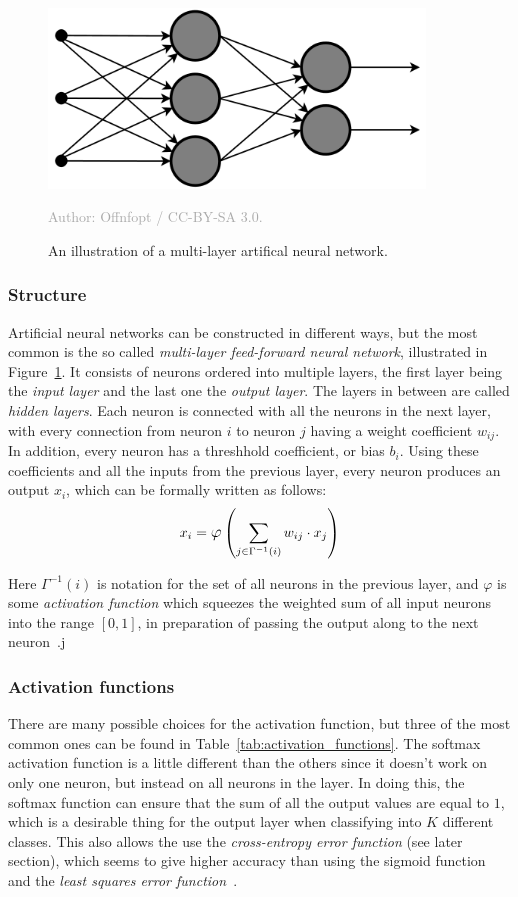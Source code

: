 \documentclass{kththesis}
\newcommand{\source}[1]{\vspace{-5mm}\caption*{\textcolor{darkgray}{Author: {#1}}\vspace{-7mm}} }
\begin{document}
\begin{figure}
  \begin{center}
    \includegraphics[width=100mm]{img/neural_network.png}
    \caption{An illustration of a multi-layer artifical neural network. }
    \source{Offnfopt / CC-BY-SA 3.0.}
    \label{fig:mlf}
  \end{center}
\end{figure}

\subsubsection{Structure}
Artificial neural networks can be constructed in different ways, but the most common is the so called \textit{multi-layer feed-forward neural network}, illustrated in Figure~\ref{fig:mlf}. It consists of neurons ordered into multiple layers, the first layer being the \textit{input layer} and the last one the \textit{output layer}. The layers in between are called \textit{hidden layers}. Each neuron is connected with all the neurons in the next layer, with every connection from neuron $i$ to neuron $j$ having a weight coefficient $w_{ij}$. In addition, every neuron has a threshhold coefficient, or bias $b_i$. Using these coefficients and all the inputs from the previous layer, every neuron produces an output $x_i$, which can be formally written as follows:
\[x_i = \mathlarger{\varphi}\left(\sum_{j \in \Gamma^{-1}(i)}{w_{ij} \cdot x_j}\right)\]

Here $\Gamma^{-1}(i)$ is notation for the set of all neurons in the previous layer, and $\varphi$ is some \textit{activation function} which squeezes the weighted sum of all input neurons into the range $[0, 1]$, in preparation of passing the output along to the next neuron~\cite{mlfIntro}.j

\subsubsection{Activation functions}
There are many possible choices for the activation function, but three of the most common ones can be found in Table~\ref{tab:activation_functions}. The softmax activation function is a little different than the others since it doesn't work on only one neuron, but instead on all neurons in the layer. In doing this, the softmax function can ensure that the sum of all the output values are equal to $1$, which is a desirable thing for the output layer when classifying into $K$ different classes. This also allows the use the \textit{cross-entropy error function} (see later section), which seems to give higher accuracy than using the sigmoid function and the \textit{least squares error function}~\cite{dunne1997pairing}.
\end{document}
